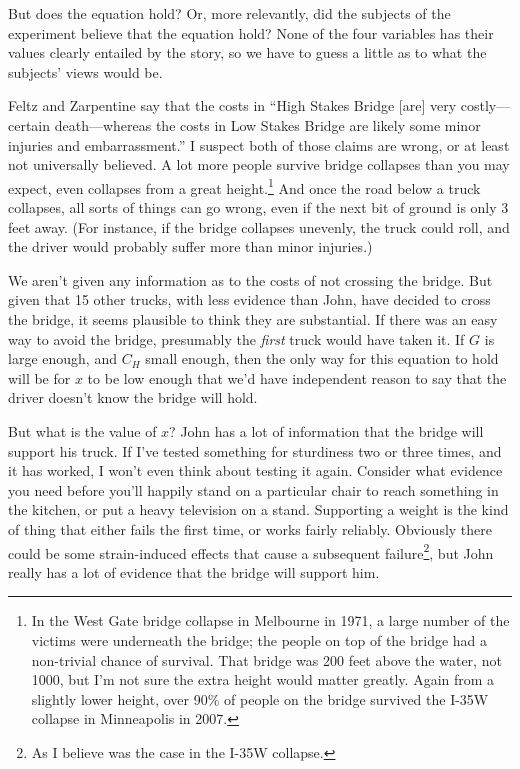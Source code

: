 But does the equation hold? Or, more relevantly, did the subjects of the experiment believe that the equation hold? None of the four variables has their values clearly entailed by the story, so we have to guess a little as to what the subjects' views would be. 

Feltz and Zarpentine say that the costs in ``High Stakes Bridge [are] very costly---certain death---whereas the costs in Low Stakes Bridge are likely some minor injuries and embarrassment.'' \cite[702]{FeltzZarpentine2010} I suspect both of those claims are wrong, or at least not universally believed. A lot more people survive bridge collapses than you may expect, even collapses from a great height.\footnote{In the West Gate bridge collapse in Melbourne in 1971, a large number of the victims were underneath the bridge; the people on top of the bridge had a non-trivial chance of survival. That bridge was 200 feet above the water, not 1000, but I'm not sure the extra height would matter greatly. Again from a slightly lower height, over 90\% of people on the bridge survived the I-35W collapse in Minneapolis in 2007.} And once the road below a truck collapses, all sorts of things can go wrong, even if the next bit of ground is only 3 feet away. (For instance, if the bridge collapses unevenly, the truck could roll, and the driver would probably suffer more than minor injuries.)

We aren't given any information as to the costs of not crossing the bridge. But given that 15 other trucks, with less evidence than John, have decided to cross the bridge, it seems plausible to think they are substantial. If there was an easy way to avoid the bridge, presumably the \textit{first} truck would have taken it. If $G$ is large enough, and $C_H$ small enough, then the only way for this equation to hold will be for $x$ to be low enough that we'd have independent reason to say that the driver doesn't know the bridge will hold.

But what is the value of $x$? John has a lot of information that the bridge will support his truck. If I've tested something for sturdiness two or three times, and it has worked, I won't even think about testing it again. Consider what evidence you need before you'll happily stand on a particular chair to reach something in the kitchen, or put a heavy television on a stand. Supporting a weight is the kind of thing that either fails the first time, or works fairly reliably. Obviously there could be some strain-induced effects that cause a subsequent failure\footnote{As I believe was the case in the I-35W collapse.}, but John really has a lot of evidence that the bridge will support him.

